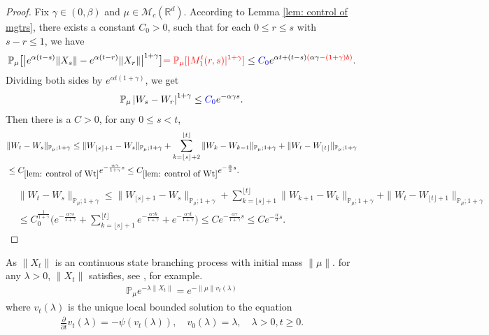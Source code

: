 \documentclass[12pt,oneside,english]{amsart}
\theoremstyle{plain}
\theoremstyle{definition}
\numberwithin{equation}{section}
\newcommand{\added}[1]{{\color{blue}#1}}\newcommand{\deleted}[1]{{\color{red}#1}}
\begin{document}
\begin{proof}
    Fix $\gamma \in (0,\beta)$ and $\mu\in \mathcal M_c(\mathbb R^d)$.
    According to Lemma \ref{lem: control of mgtrs}, there exists a constant \added{$C_0>0$}, such that for each $0\leq r\leq s $ with $s-r\leq1$, we have
    \begin{align}
        \mathbb{P}_{\mu}\big[\big|e^{\alpha(t-s)}\|X_s\|-e^{\alpha(t-r)}\|X_r\|\big|^{1+\gamma}\big]
        \deleted{=\mathbb{P}_{\mu}[|M_1^t(r,s)|^{1+\gamma}]}
        \leq \added{C_0}e^{\alpha t+(t-s)\deleted{(}\alpha\gamma\deleted{-(1+\gamma)b)}}.
    \end{align}
    Dividing both sides by $e^{\alpha t(1+\gamma)}$, we get
    \begin{align}
        \mathbb{P}_{\mu}\left|W_s-W_r\right|^{1+\gamma}\leq  \added{C_0} e^{-\alpha \gamma s}.
    \end{align}
    Then \added{there is a $C>0$,} for any $0\leq s<t$,
\deleted{
    \begin{align}
       & \|W_t-W_s\|_{\mathbb{P}_{\mu};1+\gamma}\leq \|W_{\lfloor s \rfloor +1}-W_s\|_{\mathbb{P}_{\mu};1+\gamma}+\sum_{k=\lfloor s \rfloor+2}^{\lfloor t \rfloor}\|W_k-W_{k-1}\|_{\mathbb{P}_{\mu};1+\gamma}+\|W_t-W_{\lfloor t \rfloor}\|_{\mathbb{P}_{\mu};1+\gamma}
       \\&\leq C_{\ref{lem: control of Wt}}e^{-\frac{\alpha \gamma}{1+\gamma}s}\leq C_{\ref{lem: control of Wt}}e^{-\frac{\alpha}{2}s}.
    \end{align}
}
\added{
\begin{align}
	& \|W_t-W_s\|_{\mathbb{P}_{\mu};1+\gamma}
	\leq \|W_{\lfloor s \rfloor+1}-W_s\|_{\mathbb{P}_{\mu};1+\gamma}+\sum_{k=\lfloor s \rfloor+1}^{\lfloor t \rfloor}\|W_{k+1}-W_{k}\|_{\mathbb{P}_{\mu};1+\gamma}+\|W_t-W_{\lfloor t \rfloor+1}\|_{\mathbb{P}_{\mu};1+\gamma}
	\\& \leq C_0^{\frac{1}{1+\gamma}} \Big(e^{-\frac{\alpha \gamma s}{1+\gamma}}+\sum_{k=\lfloor s \rfloor+1}^{\lfloor t \rfloor}e^{-\frac{\alpha \gamma k}{1+\gamma}}+ e^{-\frac{\alpha \gamma t}{1+\gamma}}\Big)
	\leq Ce^{-\frac{\alpha \gamma}{1+\gamma}s}\leq Ce^{-\frac{\alpha}{2}s}.
\end{align}	
}
\end{proof}
As $\|X_t\|$ is an continuous state branching process with initial mass $\|\mu\|$.
for any $\lambda>0$, $\|X_t\|$ satisfies, see \cite[Chapter 3]{Li2011Measure-valued}, for example.
\begin{align}\label{CSBP}
    \mathbb{P}_{\mu}e^{-\lambda\|X_t\|}=e^{-\|\mu\|v_t(\lambda)}
\end{align}
where $v_t(\lambda)$ is the unique local bounded solution to the equation
\begin{align*}
    \frac{\partial}{\partial t}v_t(\lambda)=-\psi(v_t(\lambda)), \quad  v_0(\lambda)=\lambda,  \quad \lambda>0, t\geq 0.
\end{align*}
\end{document}
